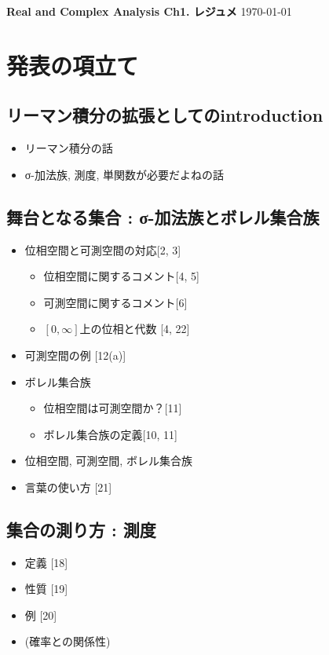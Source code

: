 \documentclass[a4paper,18pt]{jsarticle}
\begin{document}
\begin{tcolorbox}
  {\Large \bf Real and Complex Analysis Ch1. レジュメ} \hfill  \today
\end{tcolorbox}

\section{発表の項立て}
\subsection{リーマン積分の拡張としてのintroduction}
\begin{itemize}
  \item リーマン積分の話
  \item σ-加法族, 測度, 単関数が必要だよねの話
\end{itemize}

\subsection{舞台となる集合 : σ-加法族とボレル集合族}
\begin{itemize}
  \item 位相空間と可測空間の対応[2, 3]
  \begin{itemize}
    \item 位相空間に関するコメント[4, 5]
    \item 可測空間に関するコメント[6]
    \item $[0, \infty]$上の位相と代数 [4, 22]
  \end{itemize}
  \item 可測空間の例 [12(a)]
  \item ボレル集合族
  \begin{itemize}
    \item 位相空間は可測空間か？[11]
    \item ボレル集合族の定義[10, 11]
  \end{itemize}
  \item 位相空間, 可測空間, ボレル集合族
  \item 言葉の使い方 [21]
\end{itemize}


\subsection{集合の測り方 : 測度}
\begin{itemize}
  \item 定義 [18]
  \item 性質 [19]
  \item 例 [20]
  \item (確率との関係性)
\end{itemize}
\end{document}
